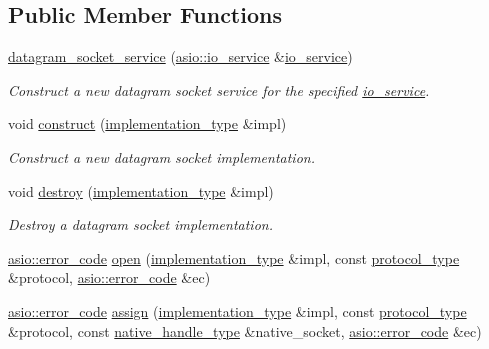 \subsection*{Public Member Functions}
\begin{DoxyCompactItemize}
\item 
\hyperlink{classasio_1_1datagram__socket__service_a6edc980d98a32a9b6cba32279da29f99}{datagram\+\_\+socket\+\_\+service} (\hyperlink{classasio_1_1io__service}{asio\+::io\+\_\+service} \&\hyperlink{classasio_1_1io__service}{io\+\_\+service})
\begin{DoxyCompactList}\small\item\em Construct a new datagram socket service for the specified \hyperlink{classasio_1_1io__service}{io\+\_\+service}. \end{DoxyCompactList}\item 
void \hyperlink{classasio_1_1datagram__socket__service_ab858950441799c6f20ad6463fa7d4a7c}{construct} (\hyperlink{classasio_1_1datagram__socket__service_a41dcdc6b8a3500d6f88e10b6c08925cd}{implementation\+\_\+type} \&impl)
\begin{DoxyCompactList}\small\item\em Construct a new datagram socket implementation. \end{DoxyCompactList}\item 
void \hyperlink{classasio_1_1datagram__socket__service_ac6430c7a9525b270f94e06c72ee29f93}{destroy} (\hyperlink{classasio_1_1datagram__socket__service_a41dcdc6b8a3500d6f88e10b6c08925cd}{implementation\+\_\+type} \&impl)
\begin{DoxyCompactList}\small\item\em Destroy a datagram socket implementation. \end{DoxyCompactList}\item 
\hyperlink{classasio_1_1error__code}{asio\+::error\+\_\+code} \hyperlink{classasio_1_1datagram__socket__service_a0b3862886b955e1fcb4c5e8897bc6ed9}{open} (\hyperlink{classasio_1_1datagram__socket__service_a41dcdc6b8a3500d6f88e10b6c08925cd}{implementation\+\_\+type} \&impl, const \hyperlink{classasio_1_1datagram__socket__service_a0c35d47066a6056f723d53a3c68685db}{protocol\+\_\+type} \&protocol, \hyperlink{classasio_1_1error__code}{asio\+::error\+\_\+code} \&ec)
\item 
\hyperlink{classasio_1_1error__code}{asio\+::error\+\_\+code} \hyperlink{classasio_1_1datagram__socket__service_ab2b8e6859c2eb0fb0e8ac155c135bc67}{assign} (\hyperlink{classasio_1_1datagram__socket__service_a41dcdc6b8a3500d6f88e10b6c08925cd}{implementation\+\_\+type} \&impl, const \hyperlink{classasio_1_1datagram__socket__service_a0c35d47066a6056f723d53a3c68685db}{protocol\+\_\+type} \&protocol, const \hyperlink{classasio_1_1datagram__socket__service_a78991c47ea915a16f6399d64e731ac07}{native\+\_\+handle\+\_\+type} \&native\+\_\+socket, \hyperlink{classasio_1_1error__code}{asio\+::error\+\_\+code} \&ec)

\end{DoxyCompactItemize}
